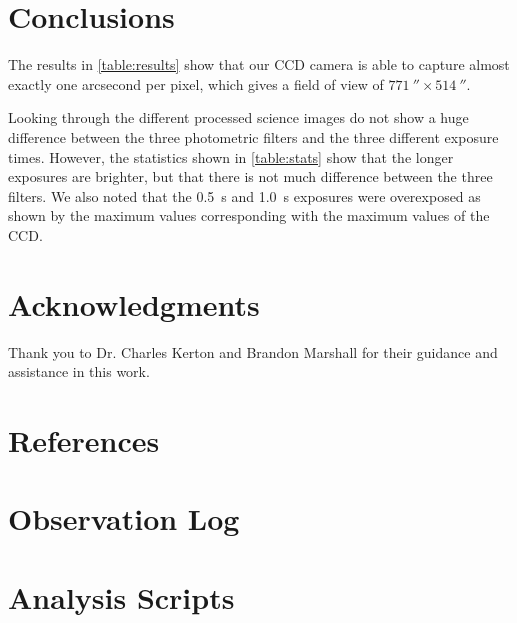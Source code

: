 \documentclass[%
aip,
jmp,
reprint,
floatfix,
nobibfootnote,
]{revtex4-1}
\begin{document}
	
	\section{Conclusions}
	
	The results in \autoref{table:results} show that our CCD camera is able to capture almost exactly one arcsecond per pixel, which gives a field of view of $\SI{771}{\arcsecond}\times\SI{514}{\arcsecond}$. 
	
	Looking through the different processed science images do not show a huge difference between the three photometric filters and the three different exposure times. However, the statistics shown in \autoref{table:stats} show that the longer exposures are brighter, but that there is not much difference between the three filters. We also noted that the \SI{0.5}{\second} and \SI{1.0}{\second} exposures were overexposed as shown by the maximum values corresponding with the maximum values of the CCD. 
	
	
	\section*{Acknowledgments}
	
	Thank you to Dr. Charles Kerton and Brandon Marshall for their guidance and assistance in this work.
	
	\section*{References}
	
	
	
	
	
	\onecolumngrid
	\appendix
	\section{Observation Log}
	
	\begin{table}[H]
		\centering
		
		\label{table:log}
	\end{table}
	
	\section{Analysis Scripts}
	
	
\end{document}
